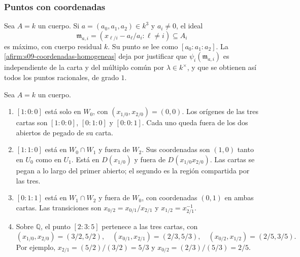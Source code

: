 \subsubsection{Puntos con coordenadas}

Sea $A=k$ un cuerpo. Si $a=(a_0,a_1,a_2)\in k^3$ y $a_i\ne0$, el ideal
\[
\mathfrak m_{a,i}=(x_{\ell/i}-a_\ell/a_i:\ell\ne i)\subseteq A_i
\]
es máximo, con cuerpo residual $k$. Su punto se lee como $[a_0:a_1:a_2]$. La \cref{afirm:s09-coordenadas-homogeneas} deja por justificar que $\psi_i(\mathfrak m_{a,i})$ es independiente de la carta y del múltiplo común por $\lambda\in k^\times$, y que se obtienen así todos los puntos racionales, de grado $1$.

\begin{ejem}
\label{ejem:s09-puntos-cartas-proyectivas}
Sea $A=k$ un cuerpo.
\begin{enumerate}[label=(\alph*)]
\item $[1:0:0]$ está solo en $W_0$, con $(x_{1/0},x_{2/0})=(0,0)$. Los orígenes de las tres cartas son $[1:0:0]$, $[0:1:0]$ y $[0:0:1]$. Cada uno queda fuera de los dos abiertos de pegado de su carta.
\item $[1:1:0]$ está en $W_0\cap W_1$ y fuera de $W_2$. Sus coordenadas son $(1,0)$ tanto en $U_0$ como en $U_1$. Está en $D(x_{1/0})$ y fuera de $D(x_{1/0}x_{2/0})$. Las cartas se pegan a lo largo del primer abierto; el segundo es la región compartida por las tres.
\item $[0:1:1]$ está en $W_1\cap W_2$ y fuera de $W_0$, con coordenadas $(0,1)$ en ambas cartas. Las transiciones son $x_{0/2}=x_{0/1}/x_{2/1}$ y $x_{1/2}=x_{2/1}^{-1}$.
\item Sobre $\mathbb Q$, el punto $[2:3:5]$ pertenece a las tres cartas, con
\[
(x_{1/0},x_{2/0})=(3/2,5/2),\quad
(x_{0/1},x_{2/1})=(2/3,5/3),\quad
(x_{0/2},x_{1/2})=(2/5,3/5).
\]
Por ejemplo, $x_{2/1}=(5/2)/(3/2)=5/3$ y $x_{0/2}=(2/3)/(5/3)=2/5$.
\end{enumerate}
\end{ejem}

